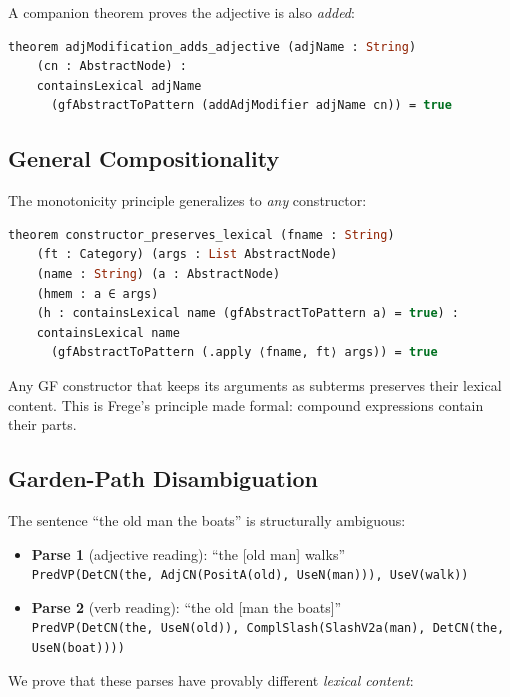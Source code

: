 \documentclass[11pt]{article}
\newcommand{\code}[1]{\texttt{#1}}
\newcommand{\GF}{\textup{GF}}
\begin{document}
A companion theorem proves the adjective is also \emph{added}:

\begin{lstlisting}[language=ml]
theorem adjModification_adds_adjective (adjName : String)
    (cn : AbstractNode) :
    containsLexical adjName
      (gfAbstractToPattern (addAdjModifier adjName cn)) = true
\end{lstlisting}

\subsection{General Compositionality}

The monotonicity principle generalizes to \emph{any} constructor:

\begin{lstlisting}[language=ml,caption={General compositionality}]
theorem constructor_preserves_lexical (fname : String)
    (ft : Category) (args : List AbstractNode)
    (name : String) (a : AbstractNode)
    (hmem : a ∈ args)
    (h : containsLexical name (gfAbstractToPattern a) = true) :
    containsLexical name
      (gfAbstractToPattern (.apply ⟨fname, ft⟩ args)) = true
\end{lstlisting}

Any \GF{} constructor that keeps its arguments as subterms preserves
their lexical content.  This is Frege's principle made formal: compound
expressions contain their parts.

\subsection{Garden-Path Disambiguation}

The sentence ``the old man the boats'' is structurally ambiguous:
\begin{itemize}
\item \textbf{Parse 1} (adjective reading): ``the [old man] walks''\\
  \code{PredVP(DetCN(the, AdjCN(PositA(old), UseN(man))), UseV(walk))}
\item \textbf{Parse 2} (verb reading): ``the old [man the boats]''\\
  \code{PredVP(DetCN(the, UseN(old)), ComplSlash(SlashV2a(man), DetCN(the, UseN(boat))))}
\end{itemize}

We prove that these parses have provably different \emph{lexical content}:
\end{document}
